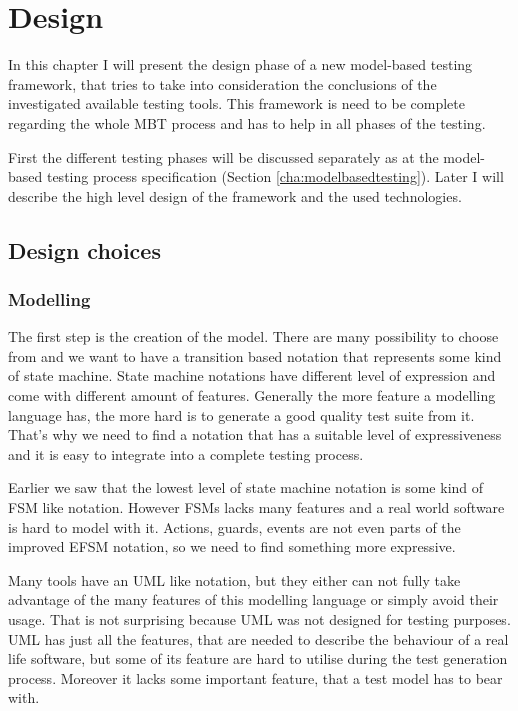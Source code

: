 \chapter{Design}
\label{cha:design}

In this chapter I will present the design phase of a new model-based testing framework, that tries to take into consideration the conclusions of the investigated available testing tools. This framework is need to be complete regarding the whole MBT process and has to help in all phases of the testing.

First the different testing phases will be discussed separately as at the model-based testing process specification (Section \ref{cha:modelbasedtesting}). Later I will describe the high level design of the framework and the used technologies.

\section{Design choices}
\label{sec:designchoices}

\subsection{Modelling}
\label{sub:designmodelling}

The first step is the creation of the model. There are many possibility to choose from and we want to have a transition based notation that represents some kind of state machine. State machine notations have different level of expression and come with different amount of features. Generally the more feature a modelling language has, the more hard is to generate a good quality test suite from it. That's why we need to find a notation that has a suitable level of expressiveness and it is easy to integrate into a complete testing process.

Earlier we saw that the lowest level of state machine notation is some kind of FSM like notation. However FSMs lacks many features and a real world software is hard to model with it. Actions, guards, events are not even parts of the improved EFSM notation, so we need to find something more expressive.

Many tools have an UML like notation, but they either can not fully take advantage of the many features of this modelling language or simply avoid their usage. That is not surprising because UML was not designed for testing purposes. UML has just all the features, that are needed to describe the behaviour of a real life software, but some of its feature are hard to utilise during the test generation process. Moreover it lacks some important feature, that a test model has to bear with.

